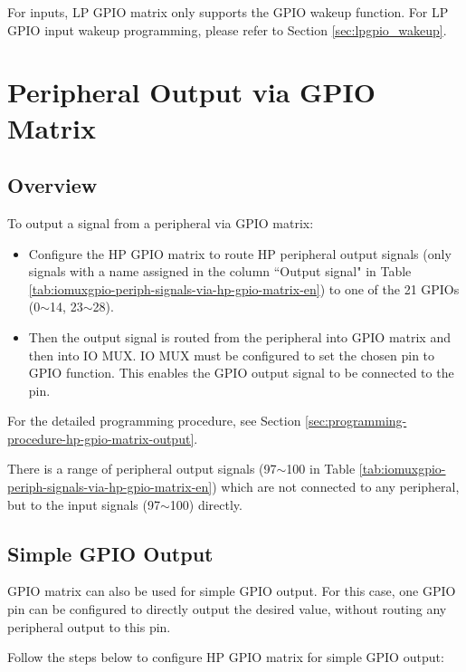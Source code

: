 \documentclass[main\_\_EN.tex]{subfiles}
\begin{document}
For inputs, LP GPIO matrix only supports the GPIO wakeup function. For LP GPIO input wakeup programming, please refer to Section \ref{sec:lpgpio_wakeup}.


\section{Peripheral Output via GPIO Matrix}
\label{sec:peripheral-output-via-gpio-matrix}

\subsection{Overview}

To output a signal from a peripheral via GPIO matrix:
\begin{itemize}
    \item Configure the HP GPIO matrix to route HP peripheral output signals (only signals with a name assigned in the column ``Output signal" in Table \ref{tab:iomuxgpio-periph-signals-via-hp-gpio-matrix-en}) to one of the 21 GPIOs (0$\sim$14, 23$\sim$28).
    \item Then the output signal is routed from the peripheral into GPIO matrix and then into IO MUX. IO MUX must be configured to set the chosen pin to GPIO function. This enables the GPIO output signal to be connected to the pin.
\end{itemize}

For the detailed programming procedure, see Section \ref{sec:programming-procedure-hp-gpio-matrix-output}.

\begin{tiplisting}
There is a range of peripheral output signals (97$\sim$100 in Table \ref{tab:iomuxgpio-periph-signals-via-hp-gpio-matrix-en}) which are not connected to any peripheral, but to the input signals (97$\sim$100) directly.
\end{tiplisting}
\vspace{-2em}


\subsection{Simple GPIO Output}\label{sec:simple-gpio-output}

GPIO matrix can also be used for simple GPIO output. For this case, one GPIO pin can be configured to directly output the desired value, without routing any peripheral output to this pin.

Follow the steps below to configure HP GPIO matrix for simple GPIO output:
\end{document}
